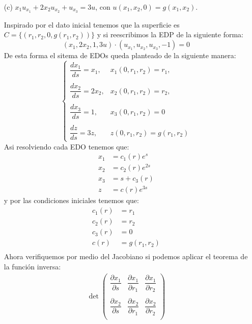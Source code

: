 \begin{homeworkProblem}
\begin{itemize}
    \item[(c)] $x_1 u_{x_1}+2 x_2 u_{x_2}+u_{x_3}=3 u$, con $u\left(x_1, x_2, 0\right)=g\left(x_1, x_2\right)$.
    \begin{solucion}
        Inspirado por el dato inicial tenemos que la superficie es $C=\{(r_1,r_2,0,g(r_1,r_2))\}$ y si reescribimos la EDP de la siguiente forma:
        $$(x_1,2x_2,1,3u)\cdot(u_{x_1},u_{x_2},u_{x_3},-1)=0$$
        De esta forma el sitema de EDOs queda planteado de la siguiente manera:
        $$\begin{cases}
            \dfrac{dx_1}{ds}=x_1,&x_1(0,r_1,r_2)=r_1,\\
            \\
            \dfrac{dx_2}{ds}=2x_2,&x_2(0,r_1,r_2)=r_2,\\
            \\
            \dfrac{dx_3}{ds}=1,&x_3(0,r_1,r_2)=0\\
            \\
            \dfrac{dz}{ds}=3z,&z(0,r_1,r_2)=g(r_1,r_2)
        \end{cases}$$
        Asi resolviendo cada EDO tenemos que:
        \begin{align*}
            x_1&=c_1(r)e^s\\
            x_2&=c_2(r)e^{2s}\\
            x_3&=s+c_3(r)\\
            z&=c(r)e^{3s}
        \end{align*}
        y por las condiciones iniciales tenemos que:
        \begin{align*}
            c_1(r)&=r_1\\
            c_2(r)&=r_2\\
            c_3(r)&=0\\
            c(r)&=g(r_1,r_2)\\
        \end{align*}
        Ahora verifiquemos por medio del Jacobiano si podemos aplicar el teorema de la función inversa:
        \begin{align*}
            \left.\det\begin{pmatrix}
                \dfrac{\partial x_1}{\partial s} & \dfrac{\partial x_1}{\partial r_1} & \dfrac{\partial x_1}{\partial r_2} \\ 
                & & \\
                \dfrac{\partial x_2}{\partial s} & \dfrac{\partial x_2}{\partial r_1} & \dfrac{\partial x_2}{\partial r_2} \\

\end{pmatrix}
\end{align*}
\end{solucion}
\end{itemize}
\end{homeworkProblem}
